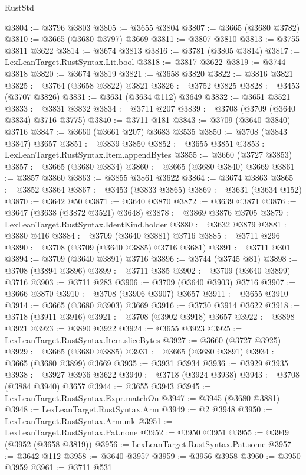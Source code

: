 \begin{lexlean}{RustStd}
\begin{coremodule}
@3804 := @3796 @3803
@3805 := @3655 @3804
@3807 := @3665 (@3680 @3782)
@3810 := @3665 (@3680 @3797) @3669
@3811 := @3807 @3810
@3813 := @3755 @3811 @3622
@3814 := @3674 @3813
@3816 := @3781 (@3805 @3814)
@3817 := LexLeanTarget.RustSyntax.Lit.bool
@3818 := @3817 @3622
@3819 := @3744 @3818
@3820 := @3674 @3819
@3821 := @3658 @3820
@3822 := @3816 @3821
@3825 := @3764 (@3658 @3822) @3821
@3826 := @3752 @3825
@3828 := @3453 (@3707 @3826)
@3831 := @3631 (@3634 @112) @3649
@3832 := @3651 @3521
@3833 := @3831 @3832
@3834 := @3711 @207
@3839 := @3708 (@3709 (@3640 @3834) @3716 @3775)
@3840 := @3711 @181
@3843 := @3709 (@3640 @3840) @3716
@3847 := @3660 (@3661 @207) @3683 @3535
@3850 := @3708 (@3843 @3847) @3657
@3851 := @3839 @3850
@3852 := @3655 @3851
@3853 := LexLeanTarget.RustSyntax.Item.appendBytes
@3855 := @3660 (@3727 @3853)
@3857 := @3665 (@3680 @3834)
@3860 := @3665 (@3680 @3840) @3669
@3861 := @3857 @3860
@3863 := @3855 @3861 @3622
@3864 := @3674 @3863
@3865 := @3852 @3864
@3867 := @3453 (@3833 @3865)
@3869 := @3631 (@3634 @152)
@3870 := @3642 @50
@3871 := @3640 @3870
@3872 := @3639 @3871
@3876 := @3647 (@3638 (@3872 @3521) @3648)
@3878 := @3869 @3876 @3705
@3879 := LexLeanTarget.RustSyntax.IdentKind.holder
@3880 := @3632 @3879
@3881 := @3880 @416
@3884 := @3709 (@3640 @3881) @3716
@3885 := @3711 @296
@3890 := @3708 (@3709 (@3640 @3885) @3716 @3681)
@3891 := @3711 @301
@3894 := @3709 (@3640 @3891) @3716
@3896 := @3744 (@3745 @81)
@3898 := @3708 (@3894 @3896)
@3899 := @3711 @385
@3902 := @3709 (@3640 @3899) @3716
@3903 := @3711 @283
@3906 := @3709 (@3640 @3903) @3716
@3907 := @3666 @3870
@3910 := @3708 (@3906 @3907) @3657
@3911 := @3655 @3910
@3914 := @3665 (@3680 @3903) @3669
@3916 := @3730 @3914 @3622
@3918 := @3718 (@3911 @3916)
@3921 := @3708 (@3902 @3918) @3657
@3922 := @3898 @3921
@3923 := @3890 @3922
@3924 := @3655 @3923
@3925 := LexLeanTarget.RustSyntax.Item.sliceBytes
@3927 := @3660 (@3727 @3925)
@3929 := @3665 (@3680 @3885)
@3931 := @3665 (@3680 @3891)
@3934 := @3665 (@3680 @3899) @3669
@3935 := @3931 @3934
@3936 := @3929 @3935
@3938 := @3927 @3936 @3622
@3940 := @3718 (@3924 @3938)
@3943 := @3708 (@3884 @3940) @3657
@3944 := @3655 @3943
@3945 := LexLeanTarget.RustSyntax.Expr.matchOn
@3947 := @3945 (@3680 @3881)
@3948 := LexLeanTarget.RustSyntax.Arm
@3949 := @2 @3948
@3950 := LexLeanTarget.RustSyntax.Arm.mk
@3951 := LexLeanTarget.RustSyntax.Pat.none
@3952 := @3950 @3951
@3955 := @3949 (@3952 (@3658 @3819))
@3956 := LexLeanTarget.RustSyntax.Pat.some
@3957 := @3642 @112
@3958 := @3640 @3957
@3959 := @3956 @3958
@3960 := @3950 @3959
@3961 := @3711 @531

\end{coremodule}
\end{lexlean}
